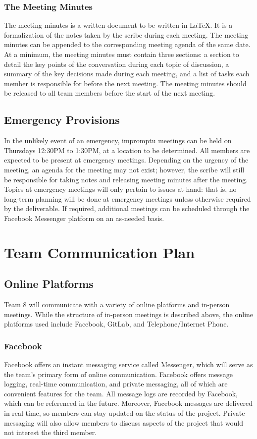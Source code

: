 \documentclass{article}
\begin{document}
\subsubsection{The Meeting Minutes}
The meeting minutes is a written document to be written in \LaTeX. It is a 
formalization of the notes taken by the scribe during each meeting. The meeting 
minutes can be appended to the corresponding meeting agenda of the same date. At 
a minimum, the meeting minutes must contain three sections: a section to detail 
the key points of the conversation during each topic of discussion, a summary of 
the key decisions made during each meeting, and a list of tasks each member is 
responsible for before the next meeting. The meeting minutes should be released 
to all team members before the start of the next meeting.

\subsection{Emergency Provisions}
In the unlikely event of an emergency, impromptu meetings can be held on 
Thursdays 12:30PM to 1:30PM, at a location to be determined. All members are 
expected to be present at emergency meetings. Depending on the urgency of the 
meeting, an agenda for the meeting may not exist; however, the scribe will still 
be responsible for taking notes and releasing meeting minutes after the meeting. 
Topics at emergency meetings will only pertain to issues at-hand: that is, no 
long-term planning will be done at emergency meetings unless otherwise required 
by the deliverable. If required, additional meetings can be scheduled through 
the Facebook Messenger platform on an as-needed basis.

\section{Team Communication Plan}
\subsection{Online Platforms}
Team 8 will communicate with a variety of online platforms and in-person 
meetings. While the structure of in-person meetings is described above, the online platforms used include Facebook, GitLab, and Telephone/Internet Phone.

\subsubsection{Facebook}
Facebook offers an instant messaging service called Messenger, which will serve as the team's primary form of online communication. Facebook offers message logging, real-time communication, and private messaging, all of which are convenient features for the team. All message logs are recorded by Facebook, which can be referenced in the future. Moreover, Facebook messages are delivered in real time, so members can stay updated on the status of the project. Private messaging will also allow members to discuss aspects of the project that would not interest the third member.
\end{document}
